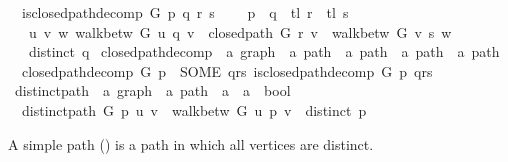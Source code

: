 \begin{isabellebody}
\ \ {\isachardoublequoteopen}is{\isacharunderscore}{\kern0pt}closed{\isacharunderscore}{\kern0pt}path{\isacharunderscore}{\kern0pt}decomp\ G\ p\ {\isacharparenleft}{\kern0pt}q{\isacharcomma}{\kern0pt}\ r{\isacharcomma}{\kern0pt}\ s{\isacharparenright}{\kern0pt}\ {\isasymlongleftrightarrow}\isanewline
\ \ \ p\ {\isacharequal}{\kern0pt}\ q\ {\isacharat}{\kern0pt}\ tl\ r\ {\isacharat}{\kern0pt}\ tl\ s\ {\isasymand}\isanewline
\ \ \ {\isacharparenleft}{\kern0pt}{\isasymexists}u\ v\ w{\isachardot}{\kern0pt}\ walk{\isacharunderscore}{\kern0pt}betw\ G\ u\ q\ v\ {\isasymand}\ closed{\isacharunderscore}{\kern0pt}path\ G\ r\ v\ {\isasymand}\ walk{\isacharunderscore}{\kern0pt}betw\ G\ v\ s\ w{\isacharparenright}{\kern0pt}\ {\isasymand}\isanewline
\ \ \ distinct\ q{\isachardoublequoteclose}\isanewline
\isanewline
{}\isamarkupfalse%
\ closed{\isacharunderscore}{\kern0pt}path{\isacharunderscore}{\kern0pt}decomp\ {\isacharcolon}{\kern0pt}{\isacharcolon}{\kern0pt}\ {\isachardoublequoteopen}{\isacharprime}{\kern0pt}a\ graph\ {\isasymRightarrow}\ {\isacharprime}{\kern0pt}a\ path\ {\isasymRightarrow}\ {\isacharprime}{\kern0pt}a\ path\ {\isasymtimes}\ {\isacharprime}{\kern0pt}a\ path\ {\isasymtimes}\ {\isacharprime}{\kern0pt}a\ path{\isachardoublequoteclose}\ \isanewline
\ \ {\isachardoublequoteopen}closed{\isacharunderscore}{\kern0pt}path{\isacharunderscore}{\kern0pt}decomp\ G\ p\ {\isasymequiv}\ SOME\ qrs{\isachardot}{\kern0pt}\ is{\isacharunderscore}{\kern0pt}closed{\isacharunderscore}{\kern0pt}path{\isacharunderscore}{\kern0pt}decomp\ G\ p\ qrs{\isachardoublequoteclose}\isanewline
\isanewline
{}\isamarkupfalse%
\ distinct{\isacharunderscore}{\kern0pt}path\ {\isacharcolon}{\kern0pt}{\isacharcolon}{\kern0pt}\ {\isachardoublequoteopen}{\isacharprime}{\kern0pt}a\ graph\ {\isasymRightarrow}\ {\isacharprime}{\kern0pt}a\ path\ {\isasymRightarrow}\ {\isacharprime}{\kern0pt}a\ {\isasymRightarrow}\ {\isacharprime}{\kern0pt}a\ {\isasymRightarrow}\ bool{\isachardoublequoteclose}\ \isanewline
\ \ {\isachardoublequoteopen}distinct{\isacharunderscore}{\kern0pt}path\ G\ p\ u\ v\ {\isasymequiv}\ walk{\isacharunderscore}{\kern0pt}betw\ G\ u\ p\ v\ {\isasymand}\ distinct\ p{\isachardoublequoteclose}%
\begin{isamarkuptext}%
A simple path () is a path in which all vertices are distinct.%
\end{isamarkuptext}\isamarkuptrue%
%
\isadeliminvisible
%
\endisadeliminvisible
%
\isataginvisible
{}\isamarkupfalse%

\end{isabellebody}
